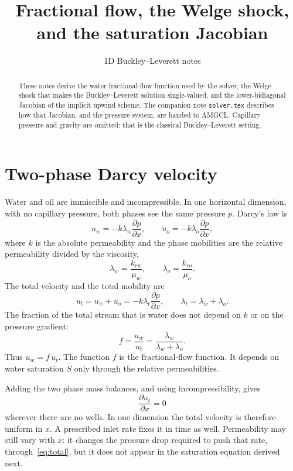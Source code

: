 \documentclass[11pt]{article}
\title{Fractional flow, the Welge shock,\\ and the saturation Jacobian}
\author{1D Buckley--Leverett notes}
\date{}
\begin{document}
\maketitle

\begin{abstract}
These notes derive the water fractional-flow function used by the solver, the Welge shock that makes the Buckley--Leverett solution single-valued, and the lower-bidiagonal Jacobian of the implicit upwind scheme.
The companion note \texttt{solver.tex} describes how that Jacobian, and the pressure system, are handed to AMGCL.
Capillary pressure and gravity are omitted: that is the classical Buckley--Leverett setting.
\end{abstract}

\section{Two-phase Darcy velocity}

Water and oil are immiscible and incompressible.
In one horizontal dimension, with no capillary pressure, both phases see the same pressure $p$.
Darcy's law is
\begin{equation}
\label{eq:darcy}
u_w = -k\lambda_w\frac{\partial p}{\partial x},
\qquad
u_o = -k\lambda_o\frac{\partial p}{\partial x},
\end{equation}
where $k$ is the absolute permeability and the phase mobilities are the relative permeability divided by the viscosity,
\begin{equation}
\label{eq:mobility}
\lambda_w = \frac{k_{rw}}{\mu_w},
\qquad
\lambda_o = \frac{k_{ro}}{\mu_o}.
\end{equation}
The total velocity and the total mobility are
\begin{equation}
\label{eq:total}
u_t = u_w + u_o = -k\lambda_t\frac{\partial p}{\partial x},
\qquad
\lambda_t = \lambda_w + \lambda_o.
\end{equation}
The fraction of the total stream that is water does not depend on $k$ or on the pressure gradient:
\begin{equation}
\label{eq:f-def}
f = \frac{u_w}{u_t} = \frac{\lambda_w}{\lambda_w + \lambda_o}.
\end{equation}
Thus $u_w = f\, u_t$.
The function $f$ is the fractional-flow function.
It depends on water saturation $S$ only through the relative permeabilities.

Adding the two phase mass balances, and using incompressibility, gives
\begin{equation}
\label{eq:div-ut}
\frac{\partial u_t}{\partial x} = 0
\end{equation}
wherever there are no wells.
In one dimension the total velocity is therefore uniform in $x$.
A prescribed inlet rate fixes it in time as well.
Permeability may still vary with $x$: it changes the pressure drop required to push that rate, through~\eqref{eq:total}, but it does not appear in the saturation equation derived next.
\end{document}

